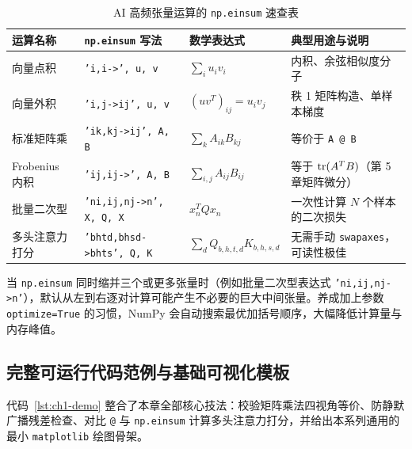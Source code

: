 \begin{table}[htbp]
\centering
\caption{AI 高频张量运算的 \texttt{np.einsum} 速查表}\label{tab:einsum-cheatsheet}
{\small
\begin{tabularx}{\linewidth}{@{}p{28mm}p{38mm}p{32mm}X@{}}
\toprule
\textbf{运算名称} & \textbf{\texttt{np.einsum} 写法} & \textbf{数学表达式} & \textbf{典型用途与说明} \\
\midrule
向量点积 & \texttt{'i,i->', u, v} & $\sum_i u_i v_i$ & 内积、余弦相似度分子 \\
向量外积 & \texttt{'i,j->ij', u, v} & $(uv^T)_{ij} = u_i v_j$ & 秩 1 矩阵构造、单样本梯度 \\
标准矩阵乘 & \texttt{'ik,kj->ij', A, B} & $\sum_k A_{ik} B_{kj}$ & 等价于 \texttt{A @ B} \\
Frobenius 内积 & \texttt{'ij,ij->', A, B} & $\sum_{i,j} A_{ij} B_{ij}$ & 等于 $\operatorname{tr}(A^T B)$（第 5 章矩阵微分） \\
批量二次型 & \texttt{'ni,ij,nj->n', X, Q, X} & $x_n^T Q x_n$ & 一次性计算 $N$ 个样本的二次损失 \\
多头注意力打分 & \texttt{'bhtd,bhsd->bhts', Q, K} & $\sum_d Q_{b,h,t,d} K_{b,h,s,d}$ & 无需手动 \texttt{swapaxes}，可读性极佳 \\
\bottomrule
\end{tabularx}}
\end{table}

\begin{remark}[多张量缩并的性能提示]
当 \texttt{np.einsum} 同时缩并三个或更多张量时（例如批量二次型表达式 \texttt{'ni,ij,nj->n'}），默认从左到右逐对计算可能产生不必要的巨大中间张量。养成加上参数 \texttt{optimize=True} 的习惯，NumPy 会自动搜索最优加括号顺序，大幅降低计算量与内存峰值。
\end{remark}

\subsection{完整可运行代码范例与基础可视化模板}

代码~\ref{lst:ch1-demo} 整合了本章全部核心技法：校验矩阵乘法四视角等价、防静默广播残差检查、对比 \texttt{@} 与 \texttt{np.einsum} 计算多头注意力打分，并给出本系列通用的最小 \texttt{matplotlib} 绘图骨架。

